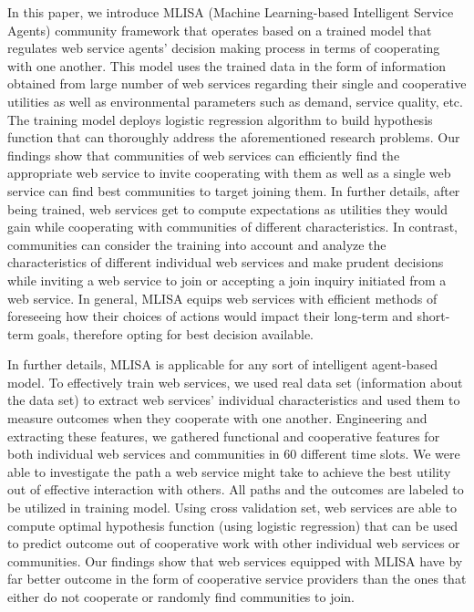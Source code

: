 \documentclass[10pt,journal,cspaper,compsoc]{IEEEtran}
\begin{document}
In this paper, we introduce MLISA (Machine Learning-based Intelligent Service Agents) community framework that operates based on a trained model that regulates web service agents' decision making process in terms of cooperating with one another. This model uses the trained data in the form of information obtained from large number of web services regarding their single and cooperative utilities as well as environmental parameters such as demand, service quality, etc. The training model deploys logistic regression algorithm to build hypothesis function that can thoroughly address the aforementioned research problems. Our findings show that communities of web services can efficiently find the appropriate web service to invite cooperating with them as well as a single web service can find best communities to target joining them. In further details, after being trained, web services get to compute expectations as utilities they would gain while cooperating with communities of different characteristics. In contrast, communities can consider the training into account and analyze the characteristics of different individual web services and make prudent decisions while inviting a web service to join or accepting a join inquiry initiated from a web service. In general, MLISA equips web services with efficient methods of foreseeing how their choices of actions would impact their long-term and short-term goals, therefore opting for best decision available. 

In further details, MLISA is applicable for any sort of intelligent agent-based model. To effectively train web services, we used real data set (information about the data set) to extract web services' individual characteristics and used them to measure outcomes when they cooperate with one another. Engineering and extracting these features, we gathered functional and cooperative features for both individual web services and communities in 60 different time slots. We were able to investigate the path a web service might take to achieve the best utility out of effective interaction with others. All paths and the outcomes are labeled to be utilized in training model. Using cross validation set, web services are able to compute optimal hypothesis function (using logistic regression) that can be used to predict outcome out of cooperative work with other individual web services or communities. Our findings show that web services equipped with MLISA have by far better outcome in the form of cooperative service providers than the ones that either do not cooperate or randomly find communities to join. 
\end{document}
